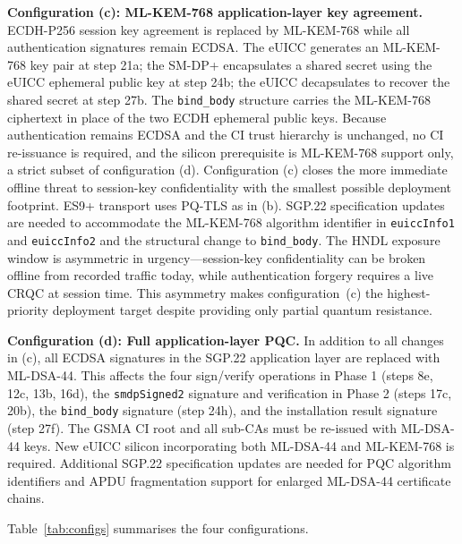 \documentclass[a4paper,fleqn]{cas-sc}
\begin{document}
\textbf{Configuration (c): ML-KEM-768 application-layer key agreement.}
ECDH-P256 session key agreement is replaced by ML-KEM-768 while all
authentication signatures remain ECDSA. The eUICC generates an ML-KEM-768
key pair at step 21a; the SM-DP+ encapsulates a shared secret using the
eUICC ephemeral public key at step 24b; the eUICC decapsulates to recover
the shared secret at step 27b. The \texttt{bind\_body} structure carries
the ML-KEM-768 ciphertext in place of the two ECDH ephemeral public keys.
Because authentication remains ECDSA and the CI trust hierarchy is
unchanged, no CI re-issuance is required, and the silicon prerequisite is
ML-KEM-768 support only, a strict subset of configuration (d).
Configuration (c) closes the more immediate offline threat to session-key
confidentiality with the smallest possible deployment footprint. ES9+
transport uses PQ-TLS as in (b). SGP.22 specification updates are
needed to accommodate the ML-KEM-768 algorithm identifier in
\texttt{euiccInfo1} and \texttt{euiccInfo2} and the structural change to
\texttt{bind\_body}.
The HNDL exposure window is asymmetric in urgency---session-key
confidentiality can be broken offline from recorded traffic today, while
authentication forgery requires a live CRQC at session time. This
asymmetry makes configuration~(c) the highest-priority deployment target
despite providing only partial quantum resistance.

\textbf{Configuration (d): Full application-layer PQC.} In addition to
all changes in (c), all ECDSA signatures in the SGP.22 application layer
are replaced with ML-DSA-44. This affects the four sign/verify operations
in Phase 1 (steps 8e, 12c, 13b, 16d), the \texttt{smdpSigned2} signature
and verification in Phase 2 (steps 17c, 20b), the \texttt{bind\_body}
signature (step 24h), and the installation result signature (step 27f).
The GSMA CI root and all sub-CAs must be re-issued with ML-DSA-44 keys.
New eUICC silicon incorporating both ML-DSA-44 and ML-KEM-768 is required.
Additional SGP.22 specification updates are needed for PQC algorithm
identifiers and APDU fragmentation support for enlarged ML-DSA-44
certificate chains.

Table~\ref{tab:configs} summarises the four configurations.
\end{document}
